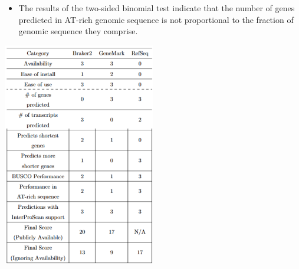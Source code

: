 \documentclass[t]{beamer}
\begin{document}
\begin{frame}
	\centering
	\vspace{2cm}
	\begin{itemize}
		\item The results of the two-sided binomial test indicate that the number of genes predicted in AT-rich genomic sequence is not proportional to the fraction of genomic sequence they comprise.
	\end{itemize}
\end{frame}

\begin{frame}
	\vspace{0.75cm}
	\centering
	\includegraphics[width=0.5\textwidth]{../../working-thesis/figures/conclusion-snip.png}
\end{frame}
\end{document}
